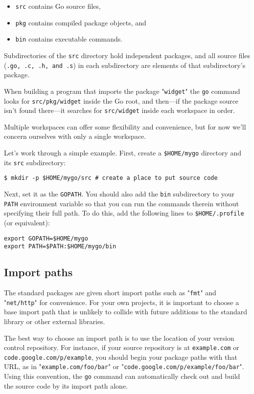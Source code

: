\begin{itemize}
  \item \verb|src| contains Go source files,
  \item \verb|pkg| contains compiled package objects, and
  \item \verb|bin| contains executable commands.
\end{itemize}

Subdirectories of the \verb|src| directory hold independent packages,
and all source files (\verb|.go, .c, .h, and .s|) in each subdirectory
are elements of that subdirectory's package.

When building a program that imports the package "\verb|widget|"
the \verb|go| command looks for \verb|src/pkg/widget| inside the
Go root, and then—if the package source isn't found there—it searches
for \verb|src/widget| inside each workspace in order.

Multiple workspaces can offer some flexibility and convenience, but
for now we'll concern ourselves with only a single workspace.

Let's work through a simple example. First, create a \verb|$HOME/mygo|
directory and its \verb|src| subdirectory:

\begin{Verbatim}[frame=single]
$ mkdir -p $HOME/mygo/src # create a place to put source code
\end{Verbatim}

Next, set it as the \verb|GOPATH|. You should also add the \verb|bin|
subdirectory to your \verb|PATH| environment variable so that you
can run the commands therein without specifying their full path.
To do this, add the following lines to \verb|$HOME/.profile| (or
equivalent):

\begin{Verbatim}[frame=single]
export GOPATH=$HOME/mygo
export PATH=$PATH:$HOME/mygo/bin
\end{Verbatim}

\subsection*{Import paths}
The standard packages are given short import paths such as "\verb|fmt|"
and "\verb|net/http|" for convenience. For your own projects, it
is important to choose a base import path that is unlikely to collide
with future additions to the standard library or other external
libraries.

The best way to choose an import path is to use the location of
your version control repository. For instance, if your source
repository is at \verb|example.com| or \verb|code.google.com/p/example|,
you should begin your package paths with that URL, as in
"\verb|example.com/foo/bar|" or "\verb|code.google.com/p/example/foo/bar|".
Using this convention, the \verb|go| command can automatically check
out and build the source code by its import path alone.

